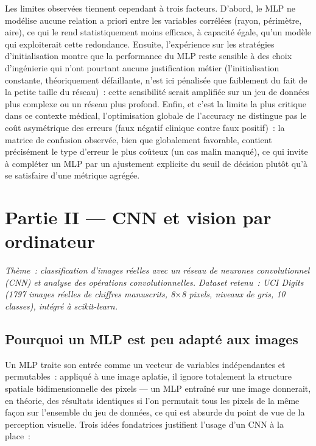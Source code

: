 \documentclass[11pt,a4paper]{article}
\begin{document}
Les limites observées tiennent cependant à trois facteurs. D'abord, le MLP ne modélise aucune relation a priori entre les variables corrélées (rayon, périmètre, aire), ce qui le rend statistiquement moins efficace, à capacité égale, qu'un modèle qui exploiterait cette redondance. Ensuite, l'expérience sur les stratégies d'initialisation montre que la performance du MLP reste sensible à des choix d'ingénierie qui n'ont pourtant aucune justification métier (l'initialisation constante, théoriquement défaillante, n'est ici pénalisée que faiblement du fait de la petite taille du réseau)~: cette sensibilité serait amplifiée sur un jeu de données plus complexe ou un réseau plus profond. Enfin, et c'est la limite la plus critique dans ce contexte médical, l'optimisation globale de l'accuracy ne distingue pas le coût asymétrique des erreurs (faux négatif clinique contre faux positif)~: la matrice de confusion observée, bien que globalement favorable, contient précisément le type d'erreur le plus coûteux (un cas malin manqué), ce qui invite à compléter un MLP par un ajustement explicite du seuil de décision plutôt qu'à se satisfaire d'une métrique agrégée.

\newpage
\section{Partie II --- CNN et vision par ordinateur}

\textit{Thème~: classification d'images réelles avec un réseau de neurones convolutionnel (CNN) et analyse des opérations convolutionnelles. Dataset retenu~: UCI Digits (1797 images réelles de chiffres manuscrits, 8$\times$8 pixels, niveaux de gris, 10 classes), intégré à scikit-learn.}

\subsection{Pourquoi un MLP est peu adapté aux images}

Un MLP traite son entrée comme un vecteur de variables indépendantes et permutables~: appliqué à une image aplatie, il ignore totalement la structure spatiale bidimensionnelle des pixels --- un MLP entraîné sur une image donnerait, en théorie, des résultats identiques si l'on permutait tous les pixels de la même façon sur l'ensemble du jeu de données, ce qui est absurde du point de vue de la perception visuelle. Trois idées fondatrices justifient l'usage d'un CNN à la place~:
\end{document}
